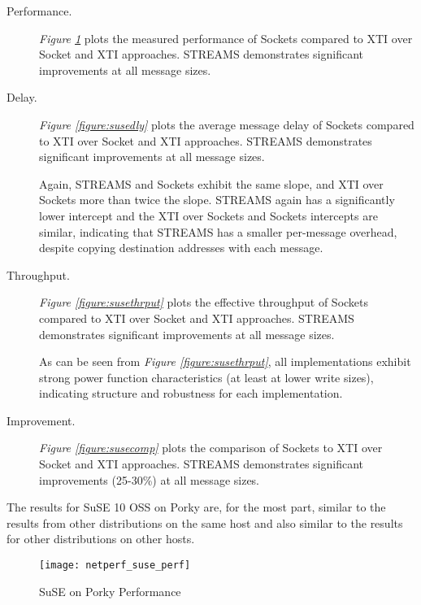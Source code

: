 \documentclass[letterpaper,final,notitlepage,twocolumn,10pt,twoside]{article}
\begin{document}
\begin{description}

\item[Performance.]

\textit{Figure \ref{figure:suseperf}}
plots the measured performance of Sockets compared to XTI over Socket and XTI approaches.  STREAMS
demonstrates significant improvements at all message sizes.

\item[Delay.]

\textit{Figure \ref{figure:susedly}}
plots the average message delay of Sockets compared to XTI over Socket and XTI approaches.  STREAMS
demonstrates significant improvements at all message sizes.

Again, STREAMS and Sockets exhibit the same slope, and XTI over Sockets more than twice the slope.
STREAMS again has a significantly lower intercept and the XTI over Sockets and Sockets intercepts
are similar, indicating that STREAMS has a smaller per-message overhead, despite copying destination
addresses with each message.

\item[Throughput.]

\textit{Figure \ref{figure:susethrput}}
plots the effective throughput of Sockets compared to XTI over Socket and XTI approaches.  STREAMS
demonstrates significant improvements at all message sizes.

As can be seen from \textit{Figure \ref{figure:susethrput}}, all implementations exhibit strong
power function characteristics (at least at lower write sizes), indicating structure and robustness
for each implementation.

\item[Improvement.]

\textit{Figure \ref{figure:susecomp}}
plots the comparison of Sockets to XTI over Socket and XTI approaches.  STREAMS demonstrates
significant improvements (25-30\%) at all message sizes.

\end{description}

The results for SuSE 10 OSS on Porky are, for the most part, similar to the results from other
distributions on the same host and also similar to the results for other distributions on other
hosts.

\begin{figure}[p]
\center\texttt{[image: netperf\_suse\_perf]}
\caption[SuSE on Porky Performance]{SuSE on Porky Performance}
\label{figure:suseperf}
\end{figure}
\end{document}
